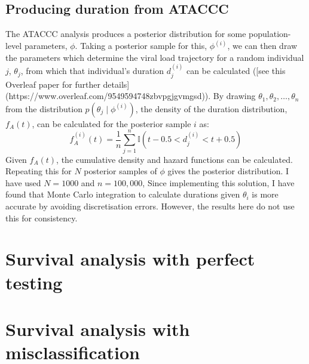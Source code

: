 \documentclass[a4paper]{report}
\begin{document}
\section{Producing duration from ATACCC}

The ATACCC analysis produces a posterior distribution for some population-level parameters, $\phi$.
Taking a posterior sample for this, $\phi^{(i)}$, we can then draw the parameters which determine the viral
load trajectory for a random individual $j$, $\theta_j$, from which that individual's duration $d_j^{(i)}$ can be calculated ([see this Overleaf paper for further details](https://www.overleaf.com/9549594748zbvpgjgvmgsd)).
By drawing $\theta_1, \theta_2, \dots, \theta_n$ from the distribution $p(\theta_j \mid\phi^{(i)})$, the density of the duration distribution, $f_A(t)$, can be
calculated for the posterior sample $i$ as:
$$
f^{(i)}_A(t) = \frac{1}{n}\sum_{j=1}^n \mathbb{I} \left( t-0.5 < d_j^{(i)} < t+0.5 \right)
$$
Given $f_A(t)$, the cumulative density and hazard functions can be calculated.
Repeating this for $N$ posterior samples of $\phi$ gives the posterior distribution.
I have used $N = 1000$ and $n = 100,000$, 
Since implementing this solution, I have found that Monte Carlo integration to calculate durations given $\theta_i$ is more accurate by avoiding discretisation errors.
However, the results here do not use this for consistency.

\chapter{Survival analysis with perfect testing} \label{perf-test}



\chapter{Survival analysis with misclassification} \label{imperf-test}


\end{document}
